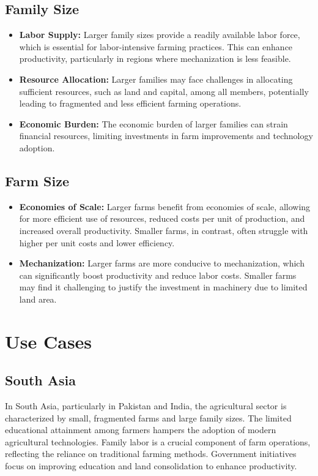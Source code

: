 \documentclass[12pt]{article}
\begin{document}
\subsection*{Family Size}
\begin{itemize}
    \item \textbf{Labor Supply:} Larger family sizes provide a readily available labor force, which is essential for labor-intensive farming practices. This can enhance productivity, particularly in regions where mechanization is less feasible.
    \item \textbf{Resource Allocation:} Larger families may face challenges in allocating sufficient resources, such as land and capital, among all members, potentially leading to fragmented and less efficient farming operations.
    \item \textbf{Economic Burden:} The economic burden of larger families can strain financial resources, limiting investments in farm improvements and technology adoption.
\end{itemize}

\subsection*{Farm Size}
\begin{itemize}
    \item \textbf{Economies of Scale:} Larger farms benefit from economies of scale, allowing for more efficient use of resources, reduced costs per unit of production, and increased overall productivity. Smaller farms, in contrast, often struggle with higher per unit costs and lower efficiency.
    \item \textbf{Mechanization:} Larger farms are more conducive to mechanization, which can significantly boost productivity and reduce labor costs. Smaller farms may find it challenging to justify the investment in machinery due to limited land area.
\end{itemize}

\section{Use Cases}
\subsection{South Asia}
In South Asia, particularly in Pakistan and India, the agricultural sector is characterized by small, fragmented farms and large family sizes. The limited educational attainment among farmers hampers the adoption of modern agricultural technologies. Family labor is a crucial component of farm operations, reflecting the reliance on traditional farming methods. Government initiatives focus on improving education and land consolidation to enhance productivity.
\end{document}
